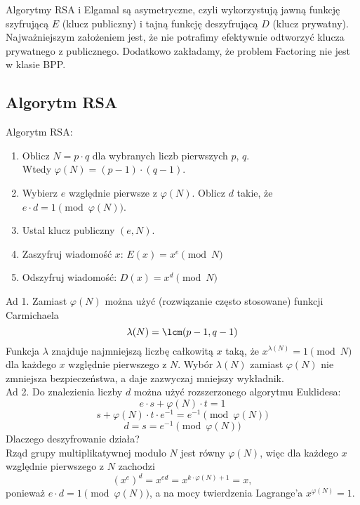 Algorytmy RSA i Elgamal są asymetryczne, czyli wykorzystują jawną funkcję szyfrującą \( E \) (klucz publiczny) i tajną funkcję deszyfrującą \( D \) (klucz prywatny).
Najważniejszym założeniem jest, że nie potrafimy efektywnie odtworzyć klucza prywatnego z publicznego. Dodatkowo zakładamy, że problem Factoring nie jest w klasie BPP.

\subsection{Algorytm RSA}
\begin{greyframe}
    Algorytm RSA:
    \begin{enumerate}
        \item Oblicz \( N = p \cdot q \) dla wybranych liczb pierwszych \( p \), \( q \). \\
        Wtedy \( \varphi(N) = (p-1) \cdot (q-1) \).
        \item Wybierz \( e \) względnie pierwsze z \( \varphi(N) \). Oblicz \( d \) takie, że  \( e\cdot d = 1 \pmod{\varphi(N)} \).
        \item Ustal klucz publiczny \( (e, N) \).
        \item Zaszyfruj wiadomość \( x \): \( E(x) = x^e \pmod{N} \)
        \item Odszyfruj wiadomość: \( D(x) = x^d \pmod{N} \)
    \end{enumerate}
\end{greyframe}

Ad 1. Zamiast \( \varphi(N) \) można użyć (rozwiązanie często stosowane) funkcji Carmichaela
\[
    \lambda(N) = \lcm(p - 1, q - 1)
\]
Funkcja \( \lambda \) znajduje najmniejszą liczbę całkowitą \( x \) taką, że \( x^{\lambda(N)} = 1 \pmod{N} \) dla każdego \( x \) względnie pierwszego z \( N \).
Wybór \( \lambda(N) \) zamiast \( \varphi(N) \) nie zmniejsza bezpieczeństwa, a daje zazwyczaj mniejszy wykładnik. \\
Ad 2. Do znalezienia liczby \( d \) można użyć rozszerzonego algorytmu Euklidesa:
\[
    e \cdot s + \varphi(N) \cdot t = 1
\]
\[
    s + \varphi(N) \cdot t \cdot e^{-1} = e^{-1} \pmod{\varphi(N)}
\]
\[
    d = s = e^{-1} \pmod{\varphi(N)}
\]
Dlaczego deszyfrowanie działa? \\
Rząd grupy multiplikatywnej modulo \( N \) jest równy \( \varphi(N) \), więc dla każdego \( x \) względnie pierwszego z \( N \) zachodzi
\[
    (x^{e})^d = x^{ed} = x^{k \cdot \varphi(N) + 1} = x,
\]
ponieważ \( e \cdot d = 1 \pmod{\varphi(N)} \), a na mocy twierdzenia Lagrange'a \( x^{\varphi(N)} = 1 \).

